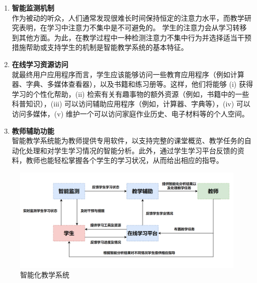 \documentclass[UTF8]{ctexart}
\begin{document}
		\begin{enumerate}[(1)]
			\item \textbf{智能监测机制}\\作为被动的听众，人们通常发现很难长时间保持恒定的注意力水平，而教学研究表明，在学习中注意力不集中是不可避免的。
				  学生的注意力会从学习转移到其他方面。为此，在教学过程中一种检测注意力不集中行为并选择适当干预措施帮助或支持学生的机制是智能教学系统的基本特征。
			\item \textbf{在线学习资源访问}\\就最终用户应用程序而言，学生应该能够访问一些教育应用程序（例如计算器、字典、多媒体查看器），以及书籍和练习册等。这样，他们将能够 (i) 获得学习的个性化帮助，(ii) 检索有关有趣事物的额外资源（例如，书籍中的一些科普知识），(iii) 可以访问辅助应用程序（例如，计算器、字典等），(iv) 可以访问多媒体，(v) 维护一个可以访问家庭作业历史、电子材料等的个人空间。
			\item \textbf{教师辅助功能}\\智能教学系统能为教师提供专用软件，以支持完整的课堂概览、教学任务的自动化处理和对学生学习情况的智能分析。此外，通过学生学习平台反馈的资料，教师也能轻松掌握各个学生的学习状况，从而给出相应的指导。
		\end{enumerate}

		\begin{figure}[H]
			\centering
			\includegraphics[width=1\textwidth]{fenxi}
			\caption{智能化教学系统}
			\end{figure}
	
\end{document}
